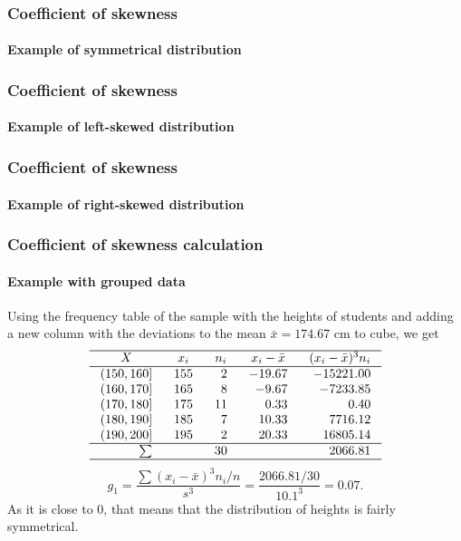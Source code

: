   
\begin{frame}
\frametitle{Coefficient of skewness}
\framesubtitle{Example of symmetrical distribution}
\begin{center}
\scalebox{0.6}{}
\end{center}
\end{frame} 


\begin{frame}
\frametitle{Coefficient of skewness}
\framesubtitle{Example of left-skewed distribution}
\begin{center}
\scalebox{0.6}{}
\end{center}
\end{frame} 


\begin{frame}
\frametitle{Coefficient of skewness}
\framesubtitle{Example of right-skewed distribution}
\begin{center}
\scalebox{0.6}{}
\end{center}
\end{frame}


\begin{frame}
\frametitle{Coefficient of skewness calculation}
\framesubtitle{Example with grouped data}
Using the frequency table of the sample with the heights of students and adding a new column with the deviations to
the mean $\bar x = 174.67$ cm to cube, we get
\[
\setlength\arraycolsep{3mm}
\setlength\arrayrulewidth{0.5pt}
\begin{array}{rrrrr}
\hline
\multicolumn{1}{c}{X} & \multicolumn{1}{c}{x_i} & \multicolumn{1}{c}{n_i} & \multicolumn{1}{c}{x_i-\bar x} & \multicolumn{1}{c}{(x_i-\bar x)^3 n_i} \\
\hline
(150,160] & 155 & 2 & -19.67 & -15221.00\\
(160,170] & 165 & 8 & -9.67 & -7233.85\\
(170,180] & 175 & 11 & 0.33 & 0.40\\
(180,190] & 185 & 7 & 10.33 & 7716.12\\
(190,200] & 195 & 2 & 20.33 & 16805.14\\
\hline
\sum &  & 30 & & 2066.81 \\
\hline
\end{array}
\]
\[
g_1 = \frac{\sum (x_i-\bar x)^3n_i/n}{s^3} = \frac{2066.81/30}{10.1^3} = 0.07.
\]
As it is close to 0, that means that the distribution of heights is fairly symmetrical. 
\end{frame}


